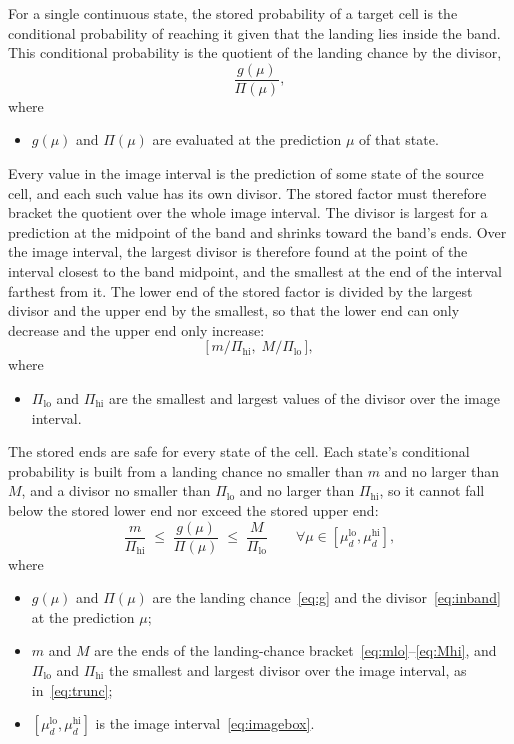 \documentclass[11pt,a4paper]{article}
\theoremstyle{plain}
\theoremstyle{remark}
\begin{document}
	
	For a single continuous state, the stored probability of a target
	cell is the conditional probability of reaching it given that the
	landing lies inside the band. This conditional probability is the
	quotient of the landing chance by the divisor,
	\begin{equation}
		\frac{g(\mu)}{\Pi(\mu)},
		\label{eq:quotient}
	\end{equation}
	where
	\begin{itemize}
		\item $g(\mu)$ and $\Pi(\mu)$ are evaluated at the prediction $\mu$
		of that state.
	\end{itemize}
	Every value in the image interval is the prediction of some state of
	the source cell, and each such value has its own divisor. The stored
	factor must therefore bracket the quotient over the whole image
	interval. The divisor is largest for a prediction at the midpoint of the band
	and shrinks toward the band's ends. Over the image interval, the
	largest divisor is therefore found at the point of the interval
	closest to the band midpoint, and the smallest at the end of the
	interval farthest from it. The lower end of the stored factor is
	divided by the largest divisor and the upper end by the smallest, so
	that the lower end can only decrease and the upper end only increase:
	\begin{equation}
		\bigl[\,m/\Pi_{\text{hi}},\; M/\Pi_{\text{lo}}\,\bigr],
		\label{eq:trunc}
	\end{equation}
	where
	\begin{itemize}
		\item $\Pi_{\text{lo}}$ and $\Pi_{\text{hi}}$ are the smallest and
		largest values of the divisor over the image interval.
	\end{itemize}
	
	The stored ends are safe for every state of the cell. Each state's
	conditional probability is built from a landing chance no smaller
	than $m$ and no larger than $M$, and a divisor no smaller than
	$\Pi_{\text{lo}}$ and no larger than $\Pi_{\text{hi}}$, so it cannot
	fall below the stored lower end nor exceed the stored upper end:
	\begin{equation}
		\frac{m}{\Pi_{\text{hi}}} \;\le\; \frac{g(\mu)}{\Pi(\mu)} \;\le\;
		\frac{M}{\Pi_{\text{lo}}}
		\qquad \forall \mu \in [\mu_d^{\text{lo}}, \mu_d^{\text{hi}}],
		\label{eq:truncsound}
	\end{equation}
	where
	\begin{itemize}
		\item $g(\mu)$ and $\Pi(\mu)$ are the landing chance~\eqref{eq:g}
		and the divisor~\eqref{eq:inband} at the prediction $\mu$;
		\item $m$ and $M$ are the ends of the landing-chance
		bracket~\eqref{eq:mlo}--\eqref{eq:Mhi}, and $\Pi_{\text{lo}}$ and
		$\Pi_{\text{hi}}$ the smallest and largest divisor over the image
		interval, as in~\eqref{eq:trunc};
		\item $[\mu_d^{\text{lo}}, \mu_d^{\text{hi}}]$ is the image
		interval~\eqref{eq:imagebox}.
	\end{itemize}
		
\end{document}
